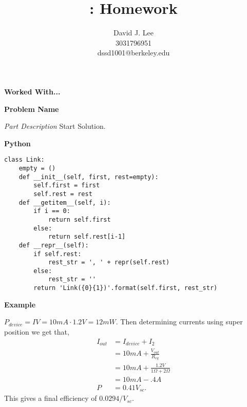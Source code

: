 \documentclass[letter]{article}
\title{\class: Homework \hwn}
\author{David J. Lee\\3031796951\\dssd1001@berkeley.edu}
\newenvironment{menumerate}{\edef\backupindent{\the\parindent}
  \enumerate\setlength{\parindent}{\backupindent}}
  {\endenumerate}
\begin{document}
\maketitle
\thispagestyle{empty}

\begin{menumerate}
    \item \textbf{Worked With...}

    \newpage
    \item \textbf{Problem Name}
    \begin{menumerate}
        \item \emph{Part Description}
        Start Solution.
        \item
        \item
        \item
    \end{menumerate}

    \item \textbf{Python}
    \begin{lstlisting}
class Link:
    empty = ()
    def __init__(self, first, rest=empty):
        self.first = first
        self.rest = rest
    def __getitem__(self, i):
        if i == 0:
            return self.first
        else:
            return self.rest[i-1]
    def __repr__(self):
        if self.rest:
            rest_str = ', ' + repr(self.rest)
        else:
            rest_str = ''
        return 'Link({0}{1})'.format(self.first, rest_str)
    \end{lstlisting}

    \newpage
    \item \textbf{Example}
    \begin{menumerate}
        \item $P_{device} = IV = 10mA \cdot 1.2 V = 12 mW.$
          Then determining currents using super position we get that,
          \begin{equation*}
            \begin{aligned}
                I_{out} &= I_{device} + I_2 \\
                &= 10mA + \frac{V_{out}}{R_{eq}} \\
                &= 10mA + \frac{1.2V}{1 \Omega + 2 \Omega} \\
                &= 10mA - .4A\\
                P &= 0.41 V_{sc}.
            \end{aligned}
          \end{equation*}
          This gives a final efficiency of $0.0294/V_{sc}.$


\end{menumerate}
\end{menumerate}
\end{document}
